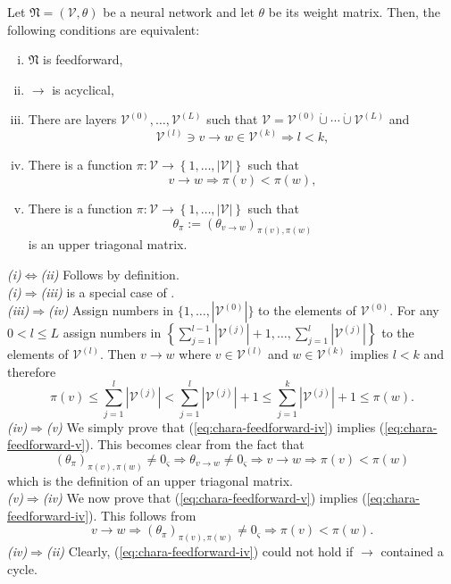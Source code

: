 \documentclass[a4paper,11pt]{report}
\newcommand{\const}{\varsigma} %
\begin{document}
\begin{Pro}\label{pro:chara-feedforward}
Let $\mathfrak{N}=(\mathcal{V},\theta)$ be a neural network and let $\theta$ be its weight matrix. Then, the following conditions are equivalent:
\begin{enumerate}[(i)]
\item
$\mathfrak{N}$ is feedforward,
\item
$\to$ is acyclical,
\item
There are layers $\mathcal{V}^{(0)},\dotsc,\mathcal{V}^{(L)}$ such that $\mathcal{V}=\mathcal{V}^{(0)}\dot{\cup}\dotsb\dot{\cup}\mathcal{V}^{(L)}$ and 
\begin{equation}
\mathcal{V}^{(l)}\ni v\to w\in\mathcal{V}^{(k)}\Rightarrow l<k,
\end{equation}
\item
There is a function $\pi:\mathcal{V}\to\left\{1,\dotsc,|\mathcal{V}|\right\}$ such that
\begin{equation}\label{eq:chara-feedforward-iv}
v\to w\Rightarrow \pi(v)<\pi(w),
\end{equation}
\item
There is a function $\pi:\mathcal{V}\to\left\{1,\dotsc,|\mathcal{V}|\right\}$ such that
\begin{equation}\label{eq:chara-feedforward-v}
\theta_{\pi}:=\left(\theta_{v\to w}\right)_{\pi(v),\pi(w)}
\end{equation}
is an upper triagonal matrix.
\end{enumerate}
\end{Pro}

\begin{Bew}
\textit{(i)$\Leftrightarrow$(ii)}
Follows by definition.\\
\textit{(i)$\Rightarrow$(iii)}
is a special case of .\\
\textit{(iii)$\Rightarrow$(iv)}
Assign numbers in $\{1,\dotsc,|\mathcal{V}^{(0)}|\}$ to the elements of $\mathcal{V}^{(0)}$. For any $0<l\le L$ assign numbers in $\left\{\sum_{j=1}^{l-1}|\mathcal{V}^{(j)}|+1,\dotsc,\sum_{j=1}^{l}|\mathcal{V}^{(j)}|\right\}$ to the elements of $\mathcal{V}^{(l)}$. Then $v\to w$ where $v\in\mathcal{V}^{(l)}$ and $w\in\mathcal{V}^{(k)}$ implies $l<k$ and therefore 
\[
\pi(v)\le \sum_{j=1}^{l}|\mathcal{V}^{(j)}|<\sum_{j=1}^{l}|\mathcal{V}^{(j)}|+1\le \sum_{j=1}^{k}|\mathcal{V}^{(j)}|+1\le\pi(w).
\]
\textit{(iv)$\Rightarrow$(v)}
We simply prove that (\ref{eq:chara-feedforward-iv}) implies (\ref{eq:chara-feedforward-v}). This becomes clear from the fact that 
\[
(\theta_{\pi})_{\pi(v),\pi(w)}\ne0_{\const}\Rightarrow\theta_{v\to w}\ne0_{\const}\Rightarrow v\to w\Rightarrow\pi(v)<\pi(w)
\]
which is the definition of an upper triagonal matrix.\\
\textit{(v)$\Rightarrow$(iv)}
We now prove that (\ref{eq:chara-feedforward-v}) implies (\ref{eq:chara-feedforward-iv}). This follows from
\[
v\to w\Rightarrow(\theta_{\pi})_{\pi(v),\pi(w)}\ne0_{\const}\Rightarrow\pi(v)<\pi(w).
\]
\textit{(iv)$\Rightarrow$(ii)}
Clearly, (\ref{eq:chara-feedforward-iv}) could not hold if $\to$ contained a cycle.
\end{Bew}
\end{document}

